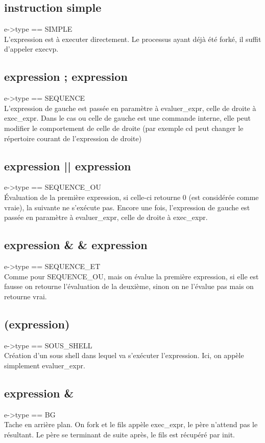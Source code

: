 \documentclass[12pt]{article}
\begin{document}
\subsection{instruction simple}
e->type == SIMPLE\\
L'expression est à executer directement.
Le processus ayant déjà été forké, il suffit d'appeler execvp.

\subsection{expression ; expression}
e->type == SEQUENCE\\
L'expression de gauche est passée en paramètre à evaluer\_expr, celle de droite à exec\_expr.
Dans le cas ou celle de gauche est une commande interne, elle peut modifier le comportement de celle de droite
(par exemple cd peut changer le répertoire courant de l'expression de droite)

\subsection{expression || expression}
e->type == SEQUENCE\_OU\\
Évaluation de la première expression, si celle-ci retourne 0 (est considérée comme vraie),
la suivante ne s'exécute pas. Encore une fois, l'expression de gauche est passée en paramètre à evaluer\_expr,
celle de droite à exec\_expr.

\subsection{expression \& \& expression}
e->type == SEQUENCE\_ET\\
Comme pour SEQUENCE\_OU, mais on évalue la première expression,
si elle est fausse on retourne l'évaluation de la deuxième, sinon on ne l'évalue pas mais on retourne vrai.

\subsection{(expression)}
e->type == SOUS\_SHELL\\
Création d'un sous shell dans lequel va s'exécuter l'expression. Ici, on appèle simplement evaluer\_expr.

\subsection{expression \&}
e->type == BG\\
Tache en arrière plan. On fork et le fils appèle exec\_expr, le père n'attend pas le résultant.
Le père se terminant de suite après, le fils est récupéré par init.
\end{document}
